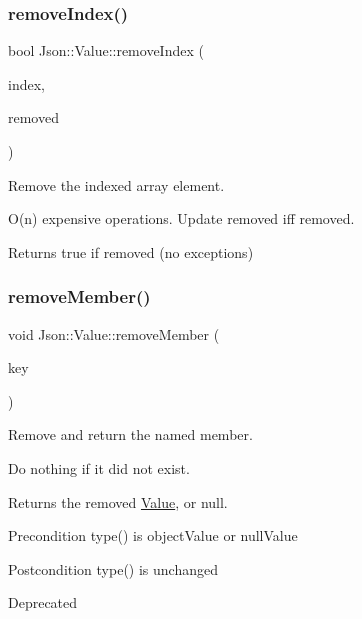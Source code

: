 \subsubsection{\texorpdfstring{remove\+Index()}{removeIndex()}}
{\footnotesize\ttfamily bool Json\+::\+Value\+::remove\+Index (\begin{DoxyParamCaption}\item[{Array\+Index}]{index,  }\item[{\hyperlink{classJson_1_1Value}{Value} $\ast$}]{removed }\end{DoxyParamCaption})}



Remove the indexed array element. 

O(n) expensive operations. Update \textquotesingle{}removed\textquotesingle{} iff removed. \begin{DoxyReturn}{Returns}
true if removed (no exceptions) 
\end{DoxyReturn}
\mbox{\label{classJson_1_1Value_a92e165f04105d27a930fb3a18a053585}} 
\subsubsection{\texorpdfstring{remove\+Member()}{removeMember()}\hspace{0.1cm}{\footnotesize\ttfamily [1/4]}}
{\footnotesize\ttfamily void Json\+::\+Value\+::remove\+Member (\begin{DoxyParamCaption}\item[{const char $\ast$}]{key }\end{DoxyParamCaption})}



Remove and return the named member. 

Do nothing if it did not exist. \begin{DoxyReturn}{Returns}
the removed \hyperlink{classJson_1_1Value}{Value}, or null. 
\end{DoxyReturn}
\begin{DoxyPrecond}{Precondition}
type() is object\+Value or null\+Value 
\end{DoxyPrecond}
\begin{DoxyPostcond}{Postcondition}
type() is unchanged 
\end{DoxyPostcond}
\begin{DoxyRefDesc}{Deprecated}
\item[\hyperlink{deprecated__deprecated000001}{Deprecated}]\end{DoxyRefDesc}
\mbox{\label{classJson_1_1Value_a8a660202bbad35857b39e85bd35ec78a}} 
